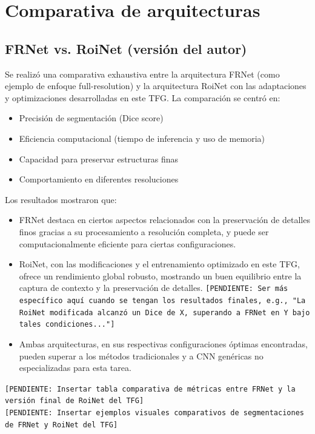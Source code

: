 \documentclass[11pt,a4paper]{report} %
\begin{document}
\section{Comparativa de arquitecturas}
\subsection{FRNet vs. RoiNet (versión del autor)}
Se realizó una comparativa exhaustiva entre la arquitectura FRNet (como ejemplo de enfoque full-resolution) y la arquitectura RoiNet con las adaptaciones y optimizaciones desarrolladas en este TFG. La comparación se centró en:
\begin{itemize}
  \item Precisión de segmentación (Dice score)
  \item Eficiencia computacional (tiempo de inferencia y uso de memoria)
  \item Capacidad para preservar estructuras finas
  \item Comportamiento en diferentes resoluciones
\end{itemize}
Los resultados mostraron que:
\begin{itemize}
  \item FRNet destaca en ciertos aspectos relacionados con la preservación de detalles finos gracias a su procesamiento a resolución completa, y puede ser computacionalmente eficiente para ciertas configuraciones.
  \item RoiNet, con las modificaciones y el entrenamiento optimizado en este TFG, ofrece un rendimiento global robusto, mostrando un buen equilibrio entre la captura de contexto y la preservación de detalles. \texttt{[PENDIENTE: Ser más específico aquí cuando se tengan los resultados finales, e.g., "La RoiNet modificada alcanzó un Dice de X, superando a FRNet en Y bajo tales condiciones..."]}
  \item Ambas arquitecturas, en sus respectivas configuraciones óptimas encontradas, pueden superar a los métodos tradicionales y a CNN genéricas no especializadas para esta tarea.
\end{itemize}
\texttt{[PENDIENTE: Insertar tabla comparativa de métricas entre FRNet y la versión final de RoiNet del TFG]} \\
\texttt{[PENDIENTE: Insertar ejemplos visuales comparativos de segmentaciones de FRNet y RoiNet del TFG]}
\end{document}
